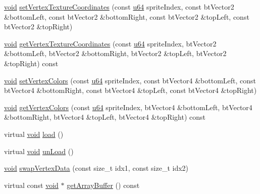 \begin{DoxyCompactItemize}
\item 
\mbox{\hyperlink{_thread_8h_af1e856da2e658414cb2456cb6f7ebc66}{void}} \mbox{\hyperlink{classnjli_1_1_sprite2_d_a2616b43af1538ab520962098e76372be}{set\+Vertex\+Texture\+Coordinates}} (const \mbox{\hyperlink{_util_8h_ad758b7a5c3f18ed79d2fcd23d9f16357}{u64}} sprite\+Index, const bt\+Vector2 \&bottom\+Left, const bt\+Vector2 \&bottom\+Right, const bt\+Vector2 \&top\+Left, const bt\+Vector2 \&top\+Right)
\item 
\mbox{\hyperlink{_thread_8h_af1e856da2e658414cb2456cb6f7ebc66}{void}} \mbox{\hyperlink{classnjli_1_1_sprite2_d_aa4ffca63ade5288e0426e70c67035f00}{get\+Vertex\+Texture\+Coordinates}} (const \mbox{\hyperlink{_util_8h_ad758b7a5c3f18ed79d2fcd23d9f16357}{u64}} sprite\+Index, bt\+Vector2 \&bottom\+Left, bt\+Vector2 \&bottom\+Right, bt\+Vector2 \&top\+Left, bt\+Vector2 \&top\+Right) const
\item 
\mbox{\hyperlink{_thread_8h_af1e856da2e658414cb2456cb6f7ebc66}{void}} \mbox{\hyperlink{classnjli_1_1_sprite2_d_a9e9b884bf7160977a67dc9e714827188}{set\+Vertex\+Colors}} (const \mbox{\hyperlink{_util_8h_ad758b7a5c3f18ed79d2fcd23d9f16357}{u64}} sprite\+Index, const bt\+Vector4 \&bottom\+Left, const bt\+Vector4 \&bottom\+Right, const bt\+Vector4 \&top\+Left, const bt\+Vector4 \&top\+Right)
\item 
\mbox{\hyperlink{_thread_8h_af1e856da2e658414cb2456cb6f7ebc66}{void}} \mbox{\hyperlink{classnjli_1_1_sprite2_d_afe5ae51437a7830eba4d733895e3b165}{get\+Vertex\+Colors}} (const \mbox{\hyperlink{_util_8h_ad758b7a5c3f18ed79d2fcd23d9f16357}{u64}} sprite\+Index, bt\+Vector4 \&bottom\+Left, bt\+Vector4 \&bottom\+Right, bt\+Vector4 \&top\+Left, bt\+Vector4 \&top\+Right) const
\item 
virtual \mbox{\hyperlink{_thread_8h_af1e856da2e658414cb2456cb6f7ebc66}{void}} \mbox{\hyperlink{classnjli_1_1_sprite2_d_afe5dc58f98c20568da4bb48cc2ade19f}{load}} ()
\item 
virtual \mbox{\hyperlink{_thread_8h_af1e856da2e658414cb2456cb6f7ebc66}{void}} \mbox{\hyperlink{classnjli_1_1_sprite2_d_a7d6d0369dd3cd6552d3a188aa323a088}{un\+Load}} ()
\item 
\mbox{\hyperlink{_thread_8h_af1e856da2e658414cb2456cb6f7ebc66}{void}} \mbox{\hyperlink{classnjli_1_1_sprite2_d_a310321527886b81f468aa818812a3347}{swap\+Vertex\+Data}} (const size\+\_\+t idx1, const size\+\_\+t idx2)
\item 
virtual const \mbox{\hyperlink{_thread_8h_af1e856da2e658414cb2456cb6f7ebc66}{void}} $\ast$ \mbox{\hyperlink{classnjli_1_1_sprite2_d_a7cac9e09519030700347f1b803a3084e}{get\+Array\+Buffer}} () const

\end{DoxyCompactItemize}
